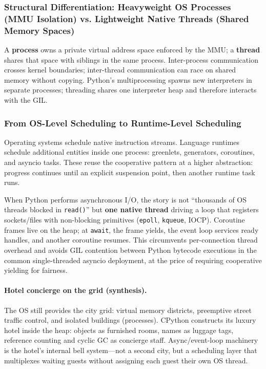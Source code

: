 \documentclass[a4paper,twoside]{report}
\begin{document}
\subsubsection{Structural Differentiation: Heavyweight OS Processes (MMU Isolation) vs. Lightweight Native Threads (Shared Memory Spaces)}

A \textbf{process} owns a private virtual address space enforced by the MMU; a \textbf{thread} shares that space with siblings in the same process. Inter-process communication crosses kernel boundaries; inter-thread communication can race on shared memory without copying. Python's multiprocessing spawns new interpreters in separate processes; threading shares one interpreter heap and therefore interacts with the GIL.

\subsubsection{From OS-Level Scheduling to Runtime-Level Scheduling}

Operating systems schedule native instruction streams. Language runtimes schedule additional entities inside one process: greenlets, generators, coroutines, and asyncio tasks. These reuse the cooperative pattern at a higher abstraction: progress continues until an explicit suspension point, then another runtime task runs.

When Python performs asynchronous I/O, the story is not ``thousands of OS threads blocked in \texttt{read()}'' but \textbf{one native thread} driving a loop that registers sockets/files with non-blocking primitives (\texttt{epoll}, \texttt{kqueue}, IOCP). Coroutine frames live on the heap; at \texttt{await}, the frame yields, the event loop services ready handles, and another coroutine resumes. This circumvents per-connection thread overhead and avoids GIL contention between Python bytecode executions in the common single-threaded asyncio deployment, at the price of requiring cooperative yielding for fairness.

\paragraph{Hotel concierge on the grid (synthesis).}
The OS still provides the city grid: virtual memory districts, preemptive street traffic control, and isolated buildings (processes). CPython constructs its luxury hotel inside the heap: objects as furnished rooms, names as luggage tags, reference counting and cyclic GC as concierge staff. Async/event-loop machinery is the hotel's internal bell system---not a second city, but a scheduling layer that multiplexes waiting guests without assigning each guest their own OS thread.
\end{document}
